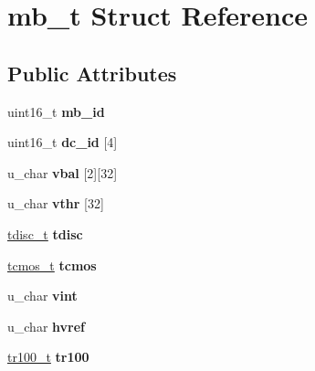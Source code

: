 \hypertarget{structmb__t}{
\section{mb\_\-t Struct Reference}
\label{structmb__t}
}
\subsection*{Public Attributes}
\begin{DoxyCompactItemize}
\item 
\hypertarget{structmb__t_a64214a771b9c95de481b48ce914643fb}{
uint16\_\-t {\bfseries mb\_\-id}}
\label{structmb__t_a64214a771b9c95de481b48ce914643fb}

\item 
\hypertarget{structmb__t_a0b4bf932747130662d76772efaf8b1f0}{
uint16\_\-t {\bfseries dc\_\-id} \mbox{[}4\mbox{]}}
\label{structmb__t_a0b4bf932747130662d76772efaf8b1f0}

\item 
\hypertarget{structmb__t_aa15ca206bb84e136514ef945c21f567f}{
u\_\-char {\bfseries vbal} \mbox{[}2\mbox{]}\mbox{[}32\mbox{]}}
\label{structmb__t_aa15ca206bb84e136514ef945c21f567f}

\item 
\hypertarget{structmb__t_ace40be8b962b4582927605037ddde13a}{
u\_\-char {\bfseries vthr} \mbox{[}32\mbox{]}}
\label{structmb__t_ace40be8b962b4582927605037ddde13a}

\item 
\hypertarget{structmb__t_a8ae13c71d18a683c62652382ba2f8b42}{
\hyperlink{structtdisc__t}{tdisc\_\-t} {\bfseries tdisc}}
\label{structmb__t_a8ae13c71d18a683c62652382ba2f8b42}

\item 
\hypertarget{structmb__t_aa619236b2a4a6748df747e7151badcfb}{
\hyperlink{structtcmos__t}{tcmos\_\-t} {\bfseries tcmos}}
\label{structmb__t_aa619236b2a4a6748df747e7151badcfb}

\item 
\hypertarget{structmb__t_afcb9482f45e42cc4ac2b3e708f0b9161}{
u\_\-char {\bfseries vint}}
\label{structmb__t_afcb9482f45e42cc4ac2b3e708f0b9161}

\item 
\hypertarget{structmb__t_abc992d6cd70eb09dff1efb106d74fa5a}{
u\_\-char {\bfseries hvref}}
\label{structmb__t_abc992d6cd70eb09dff1efb106d74fa5a}

\item 
\hypertarget{structmb__t_a5c1ab34abf85aa2d474764f35b58f4a1}{
\hyperlink{structtr100__t}{tr100\_\-t} {\bfseries tr100}}
\label{structmb__t_a5c1ab34abf85aa2d474764f35b58f4a1}


\end{DoxyCompactItemize}
